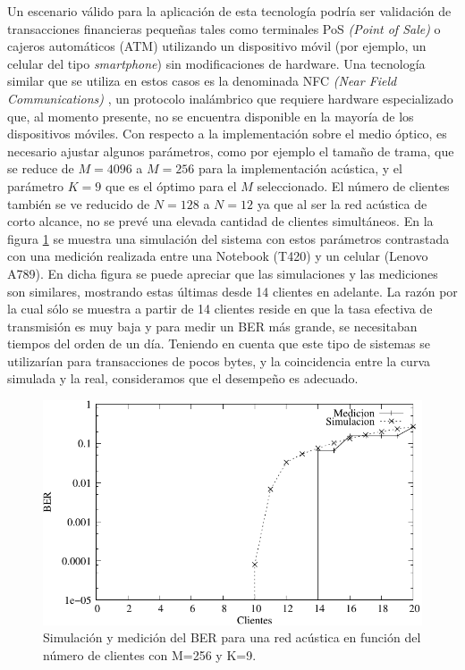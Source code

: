 Un escenario válido para la aplicación de esta tecnología podría ser validación de transacciones financieras pequeñas tales como terminales PoS \textit{(Point of Sale)} o cajeros automáticos (ATM) utilizando un dispositivo móvil (por ejemplo, un celular del tipo \textit{smartphone}) sin modificaciones de hardware. Una tecnología similar que se utiliza en estos casos es la denominada NFC \textit{(Near Field Communications)} \cite{nikitin2007overview}, un protocolo inalámbrico que requiere hardware especializado que, al momento presente, no se encuentra disponible en la mayoría de los dispositivos móviles.
Con respecto a la implementación sobre el medio óptico, es necesario ajustar algunos parámetros, como por ejemplo el tamaño de trama, que se reduce de $M=4096$ a $M=256$ para la implementación acústica, y el parámetro $K=9$ que es el óptimo para el $M$ seleccionado. El número de clientes también se ve reducido de $N=128$ a $N=12$ ya que al ser la red acústica de corto alcance, no se prevé una elevada cantidad de clientes simultáneos. En la figura \ref{arch:AudioSimul} se muestra una simulación del sistema con estos parámetros contrastada con una medición realizada entre una Notebook (T420) y un celular (Lenovo A789).  En dicha figura se puede apreciar que las simulaciones y las mediciones son similares, mostrando estas últimas desde 14 clientes en adelante. La razón por la cual sólo se muestra a partir de 14 clientes reside en que la tasa efectiva de transmisión es muy baja y para medir un BER más grande, se necesitaban tiempos del orden de un día. Teniendo en cuenta que este tipo de sistemas se utilizarían para transacciones de pocos bytes, y la coincidencia entre la curva simulada y la real, consideramos que el desempeño es adecuado.

\begin{figure}[t]
  \centering
    \includegraphics[width=5in]{graphs/audio-fig6}
    \caption{Simulación y medición del BER para una red acústica en función del número de clientes con M=256 y K=9.}
    \label{arch:AudioSimul}
\end{figure}



